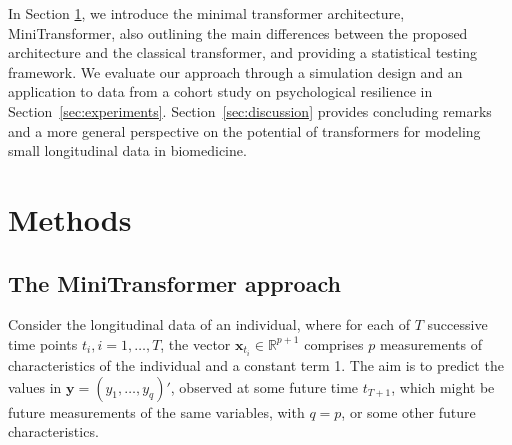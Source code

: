 \documentclass[AMA,Times1COL]{WileyNJDv5} %
\begin{document}

In Section \ref{sec:methods}, we introduce the minimal transformer architecture, MiniTransformer, also outlining  the main differences between the proposed architecture and the classical transformer, and providing a statistical testing framework. We evaluate our approach through a simulation design and an application to data from a cohort study on psychological resilience in Section~\ref{sec:experiments}. Section~\ref{sec:discussion} provides concluding remarks and a more general perspective on the potential of transformers for modeling small longitudinal data in biomedicine.


\section{Methods} \label{sec:methods}

\subsection{The MiniTransformer approach}


Consider the longitudinal data of an individual, where for each of $T$ successive time points $t_i, i=1,\ldots,T$, the vector $\mathbf{x}_{t_i} 
\in \mathbb{R}^{p+1}$ comprises $p$ measurements of characteristics of the individual and a constant term 1. The aim is to predict the values in $\mathbf{y} = (y_1, \ldots, y_{q})' $, observed at some future time $t_{T+1}$, which might be future measurements of the same variables, with $q=p$, or some other future characteristics. 
\end{document}
